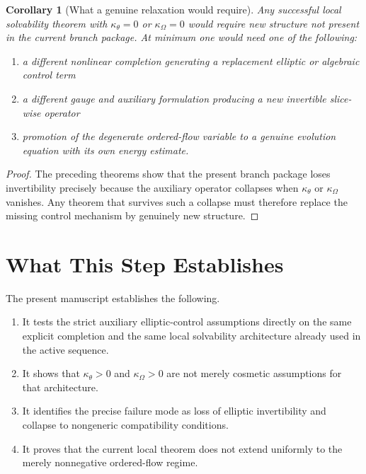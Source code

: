 \documentclass[11pt]{article}
\newtheorem{corollary}{Corollary}
\begin{document}
\begin{corollary}[What a genuine relaxation would require]
Any successful local solvability theorem with \(\kappa_\theta=0\) or \(\kappa_\Omega=0\) would require new structure not present in the current branch package. At minimum one would need one of the following:
\begin{enumerate}
    \item a different nonlinear completion generating a replacement elliptic or algebraic control term
    \item a different gauge and auxiliary formulation producing a new invertible slice-wise operator
    \item promotion of the degenerate ordered-flow variable to a genuine evolution equation with its own energy estimate.
\end{enumerate}
\end{corollary}

\begin{proof}
The preceding theorems show that the present branch package loses invertibility precisely because the auxiliary operator collapses when \(\kappa_\theta\) or \(\kappa_\Omega\) vanishes. Any theorem that survives such a collapse must therefore replace the missing control mechanism by genuinely new structure.
\end{proof}

\section{What This Step Establishes}

The present manuscript establishes the following.
\begin{enumerate}
    \item It tests the strict auxiliary elliptic-control assumptions directly on the same explicit completion and the same local solvability architecture already used in the active sequence.
    \item It shows that \(\kappa_\theta>0\) and \(\kappa_\Omega>0\) are not merely cosmetic assumptions for that architecture.
    \item It identifies the precise failure mode as loss of elliptic invertibility and collapse to nongeneric compatibility conditions.
    \item It proves that the current local theorem does not extend uniformly to the merely nonnegative ordered-flow regime.
\end{enumerate}
\end{document}

